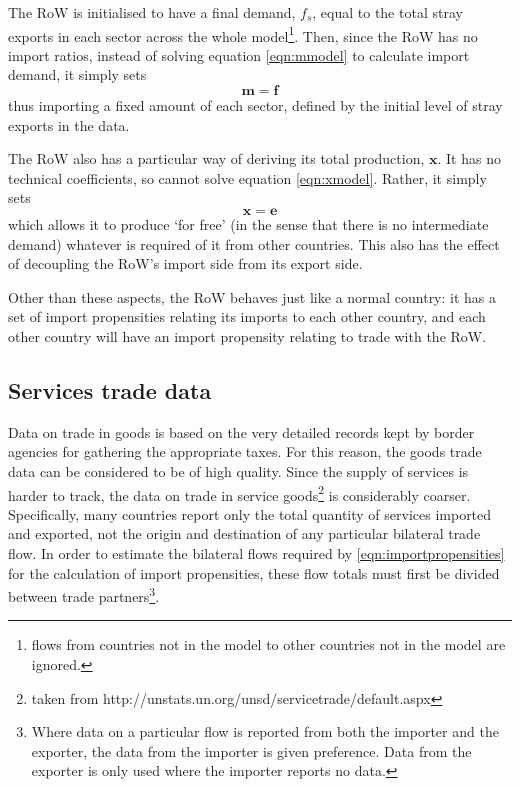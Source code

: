 \documentclass[a4paper]{article}
\begin{document}
The RoW is initialised to have a final demand, $f_s$, equal to the total stray exports in each sector across the whole model\footnote{flows from countries not in the model to other countries not in the model are ignored.}. Then, since the RoW has no import ratios, instead of solving equation \eqref{eqn:mmodel} to calculate import demand, it simply sets
\begin{equation}\label{eqn:RoW_imports}
\boldsymbol{m} = \boldsymbol{f}
\end{equation}
thus importing a fixed amount of each sector, defined by the initial level of stray exports in the data.

The RoW also has a particular way of deriving its total production, $\boldsymbol{x}$. It has no technical coefficients, so cannot solve equation \eqref{eqn:xmodel}. Rather, it simply sets
\begin{equation}\label{eqn:RoW_total_production}
\boldsymbol{x} = \boldsymbol{e}
\end{equation}
which allows it to produce `for free' (in the sense that there is no intermediate demand) whatever is required of it from other countries. This also has the effect of decoupling the RoW's import side from its export side.

Other than these aspects, the RoW behaves just like a normal country: it has a set of import propensities relating its imports to each other country, and each other country will have an import propensity relating to trade with the RoW.

\subsection{Services trade data}
Data on trade in goods is based on the very detailed records kept by border agencies for gathering the appropriate taxes.
For this reason, the goods trade data can be considered to be of high quality.
Since the supply of services is harder to track, the data on trade in service goods\footnote{taken from http://unstats.un.org/unsd/servicetrade/default.aspx} is considerably coarser.
Specifically, many countries report only the total quantity of services imported and exported, not the origin and destination of any particular bilateral trade flow.
In order to estimate the bilateral flows required by \eqref{eqn:importpropensities} for the calculation of import propensities, these flow totals must first be divided between trade partners\footnote{Where data on a particular flow is reported from both the importer and the exporter, the data from the importer is given preference.
Data from the exporter is only used where the importer reports no data.}.
\end{document}
